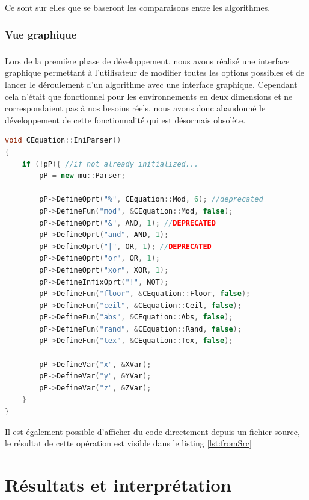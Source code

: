 \documentclass[pidr]{tnreport}
\begin{document}
Ce sont sur elles que se baseront les comparaisons entre les algorithmes. 		
		
		\subsection{Vue graphique}		
		
\paragraph{}
Lors de la première phase de développement, nous avons réalisé une interface graphique permettant à l'utilisateur de modifier toutes les options possibles et de lancer le déroulement d'un algorithme avec une interface graphique. Cependant cela n'était que fonctionnel pour les environnements en deux dimensions et ne correspondaient pas à nos besoins réels, nous avons donc abandonné le développement de cette fonctionnalité qui est désormais obsolète.
		

\begin{lstlisting}[language=c++, caption={Premier Exemple}, label={lst:premierExemple}]
void CEquation::IniParser()
{
	if (!pP){ //if not already initialized...
		pP = new mu::Parser;

		pP->DefineOprt("%", CEquation::Mod, 6); //deprecated
		pP->DefineFun("mod", &CEquation::Mod, false);
		pP->DefineOprt("&", AND, 1); //DEPRECATED
		pP->DefineOprt("and", AND, 1);
		pP->DefineOprt("|", OR, 1); //DEPRECATED
		pP->DefineOprt("or", OR, 1);
		pP->DefineOprt("xor", XOR, 1);
		pP->DefineInfixOprt("!", NOT);
		pP->DefineFun("floor", &CEquation::Floor, false);
		pP->DefineFun("ceil", &CEquation::Ceil, false);
		pP->DefineFun("abs", &CEquation::Abs, false);
		pP->DefineFun("rand", &CEquation::Rand, false);
		pP->DefineFun("tex", &CEquation::Tex, false);
	
		pP->DefineVar("x", &XVar);
		pP->DefineVar("y", &YVar);
		pP->DefineVar("z", &ZVar);
	}
}
\end{lstlisting}

Il est également possible d'afficher du code directement depuis un fichier source, le résultat de cette opération est visible dans le listing \ref{lst:fromSrc}


\chapter{Résultats et interprétation}
	
\end{document}
